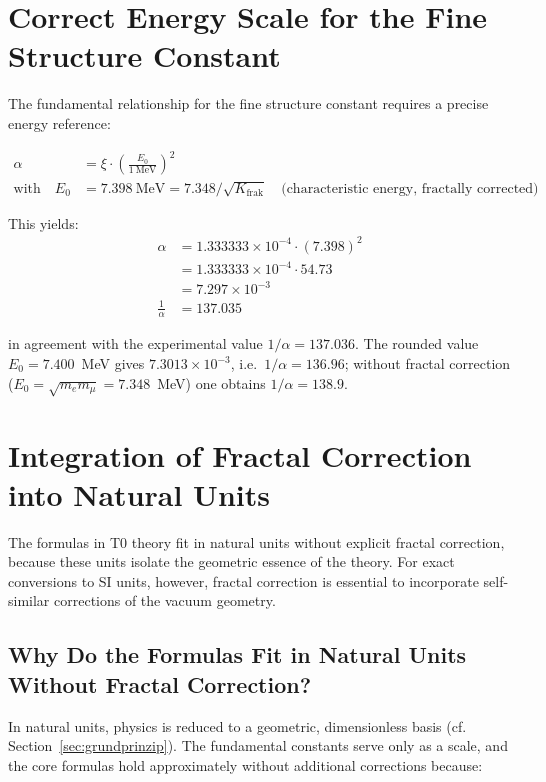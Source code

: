 	\section{Correct Energy Scale for the Fine Structure Constant}
	
	The fundamental relationship for the fine structure constant requires a precise energy reference:
	
	\begin{align}
		\alpha &= \xi \cdot \left( \frac{E_0}{1~\mathrm{MeV}} \right)^2 \\
		\text{with} \quad E_0 &= 7.398~\mathrm{MeV} = 7.348/\sqrt{K_{\text{frak}}} \quad \text{(characteristic energy, fractally corrected)}
	\end{align}
	
	This yields:
	\begin{align}
		\alpha &= 1.333333 \times 10^{-4} \cdot (7.398)^2 \\
		&= 1.333333 \times 10^{-4} \cdot 54.73 \\
		&= 7.297 \times 10^{-3} \\
		\frac{1}{\alpha} &= 137.035
	\end{align}
	
	in agreement with the experimental value $1/\alpha = 137.036$. The rounded value $E_0 = 7.400$~MeV gives $7.3013 \times 10^{-3}$, i.e.\ $1/\alpha = 136.96$; without fractal correction ($E_0 = \sqrt{m_e m_\mu} = 7.348$~MeV) one obtains $1/\alpha = 138.9$.
	
	\section{Integration of Fractal Correction into Natural Units}
	
	The formulas in T0 theory fit in natural units without explicit fractal correction, because these units isolate the geometric essence of the theory. For exact conversions to SI units, however, fractal correction is essential to incorporate self-similar corrections of the vacuum geometry.
	
	\subsection{Why Do the Formulas Fit in Natural Units Without Fractal Correction?}
	
	In natural units, physics is reduced to a geometric, dimensionless basis (cf. Section~\ref{sec:grundprinzip}). The fundamental constants serve only as a scale, and the core formulas hold approximately without additional corrections because:
	
